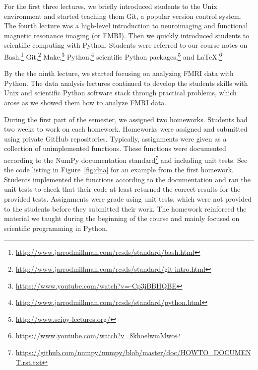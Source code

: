 For the first three lectures, we briefly introduced students to the Unix
environment and started teaching them Git, a popular version control system.
The fourth lecture was a high-level introduction to neuroimaging and
functional magnetic resonance imaging (or FMRI).
Then we quickly introduced students to scientific computing with Python.
Students were referred to our course notes on
Bash,\footnote{\url{http://www.jarrodmillman.com/rcsds/standard/bash.html}}
Git,\footnote{\url{http://www.jarrodmillman.com/rcsds/standard/git-intro.html}}
Make,\footnote{\url{https://www.youtube.com/watch?v=-Cp3jBBHQBE}}
Python,\footnote{\url{http://www.jarrodmillman.com/rcsds/standard/python.html}}
scientific Python packages,\footnote{\url{http://www.scipy-lectures.org/}}
and \LaTeX.\footnote{\url{https://www.youtube.com/watch?v=8khoelwmMwo}}

By the the ninth lecture, we started focusing on analyzing FMRI data
with Python.
The data analysis lectures continued to develop the students skills with
Unix and scientific Python software stack through practical problems,
which arose as we showed them how to analyze FMRI data.

During the first part of the semester, we assigned two homeworks.
Students had two weeks to work on each homework.
Homeworks were assigned and submitted using private GitHub repositories.
Typically, assignments were given as a collection of unimplemented
functions.
These functions were documented according to the NumPy documentation
standard\footnote{\url{https://github.com/numpy/numpy/blob/master/doc/HOWTO_DOCUMENT.rst.txt}}
and including unit tests.
See the code listing in Figure~\ref{fig:dna} for an example from the first homework.
Students implemented the functions according to the documentation
and ran the unit tests to check that their code at least
returned the correct results for the provided tests.
Assignments were grade using unit tests, which were not provided to
the students before they submitted their work.
The homework reinforced the material we taught during the
beginning of the course and mainly focused on scientific programming
in Python.


